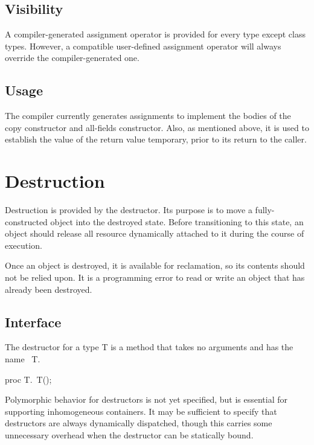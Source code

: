 \subsection{Visibility}

A compiler-generated assignment operator is provided for every type except class
types.  However, a compatible user-defined assignment operator will always
override the compiler-generated one.

\subsection{Usage}

The compiler currently generates assignments to implement the bodies of the copy
constructor and all-fields constructor.  Also, as mentioned above, it is used
to establish the value of the return value temporary, prior to its return to the
caller.

\section{Destruction}

Destruction is provided by the destructor.  Its purpose is to move a
fully-constructed object into the destroyed state.  Before transitioning to this
state, an object should release all resource dynamically attached to it during
the course of execution.

Once an object is destroyed, it is available for reclamation, so its contents
should not be relied upon.  It is a programming error to read or write an object
that has already been destroyed.

\subsection{Interface}

The destructor for a type T is a method that takes no arguments and has the name ~T.
\begin{chapel}
proc T.~T();
\end{chapel}

\begin{issue}
Polymorphic behavior for destructors is not yet specified, but is essential for
supporting inhomogeneous containers.  It may be sufficient to specify that
destructors are always dynamically dispatched, though this carries some
unnecessary overhead when the destructor can be statically bound.
\end{issue}

